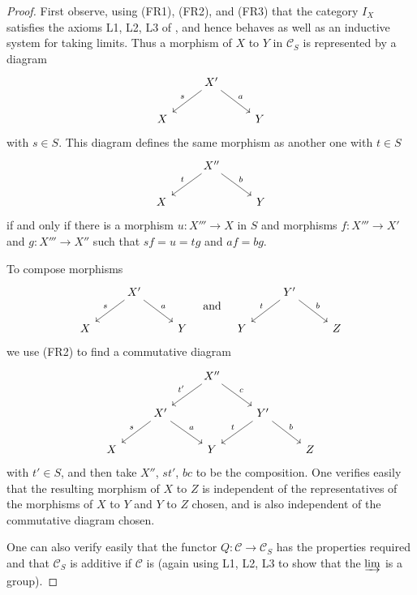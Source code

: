 \begin{proof}
First observe, using (FR1), (FR2), and (FR3) that the category \(I_X\) satisfies the axioms L1, L2, L3 of \cite[\nopp Ch.~I, \S1]{GT}, and hence behaves as well as an inductive system for taking limits. Thus a morphism of \(X\) to \(Y\) in \(\mathcal{C}_S\) is represented by a diagram
\[
\begin{tikzcd}
	& X' \arrow[ld, "s"'] \arrow[rd, "a"] & \\
	X & & Y
\end{tikzcd}
\]
with \(s \in S\). This diagram defines the same morphism as another one with \(t \in S\)
\[
\begin{tikzcd}
	& X'' \arrow[ld, "t"'] \arrow[rd, "b"] & \\
	X & & Y
\end{tikzcd}
\]
if and only if there is a morphism \(u: X''' \longrightarrow X\) in \(S\) and morphisms \(f: X''' \longrightarrow X'\) and \(g: X''' \longrightarrow X''\) such that \(sf = u = tg\) and \(af = bg\).

To compose morphisms
\[
\begin{tikzcd}
	& X' \arrow[ld, "s"'] \arrow[rd, "a"] & \\
	X & & Y
\end{tikzcd}
\quad \text{and} \quad
\begin{tikzcd}
	& Y' \arrow[ld, "t"'] \arrow[rd, "b"] & \\
	Y & & Z
\end{tikzcd}
\]
we use (FR2) to find a commutative diagram
\[
\begin{tikzcd}
	& & X'' \arrow[ld, "t'"'] \arrow[rd, "c"] & & \\
	& X' \arrow[ld, "s"'] \arrow[rd, "a"] & & Y' \arrow[ld, "t"'] \arrow[rd, "b"] & \\
	X & & Y & & Z
\end{tikzcd}
\]
with \(t' \in S\), and then take \(X''\), \(st'\), \(bc\) to be the composition. One verifies easily that the resulting morphism of \(X\) to \(Z\) is independent of the representatives of the morphisms of \(X\) to \(Y\) and \(Y\) to \(Z\) chosen, and is also independent of the commutative diagram chosen.

One can also verify easily that the functor \(Q: \mathcal{C} \longrightarrow \mathcal{C}_S\) has the properties required and that \(\mathcal{C}_S\) is additive if \(\mathcal{C}\) is (again using L1, L2, L3 to show that the \(\varinjlim\) is a group).

\end{proof}

